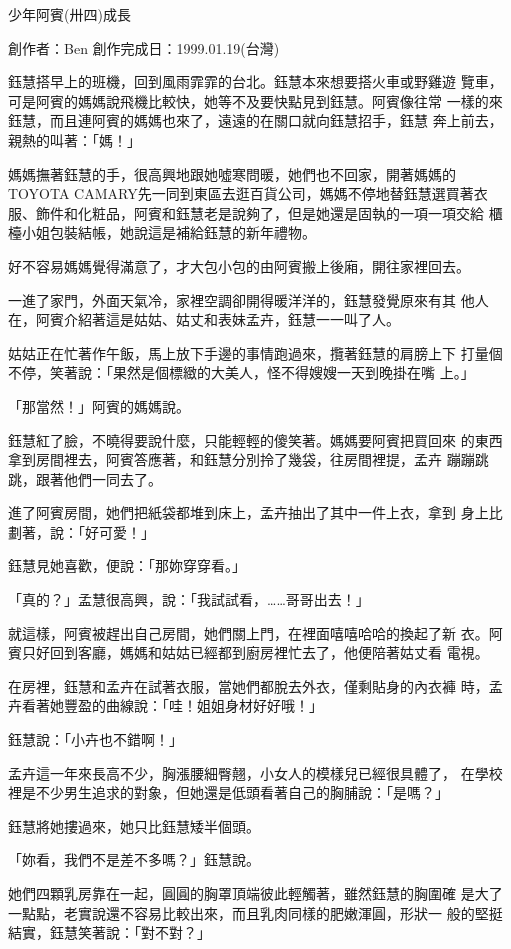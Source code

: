 



少年阿賓(卅四)成長

創作者：Ben
創作完成日：1999.01.19(台灣)


鈺慧搭早上的班機，回到風雨霏霏的台北。鈺慧本來想要搭火車或野雞遊
覽車，可是阿賓的媽媽說飛機比較快，她等不及要快點見到鈺慧。阿賓像往常
一樣的來鈺慧，而且連阿賓的媽媽也來了，遠遠的在關口就向鈺慧招手，鈺慧
奔上前去，親熱的叫著：「媽！」

媽媽撫著鈺慧的手，很高興地跟她噓寒問暖，她們也不回家，開著媽媽的
TOYOTA CAMARY先一同到東區去逛百貨公司，媽媽不停地替鈺慧選買著衣
服、飾件和化粧品，阿賓和鈺慧老是說夠了，但是她還是固執的一項一項交給
櫃檯小姐包裝結帳，她說這是補給鈺慧的新年禮物。

好不容易媽媽覺得滿意了，才大包小包的由阿賓搬上後廂，開往家裡回去。

一進了家門，外面天氣冷，家裡空調卻開得暖洋洋的，鈺慧發覺原來有其
他人在，阿賓介紹著這是姑姑、姑丈和表妹孟卉，鈺慧一一叫了人。

姑姑正在忙著作午飯，馬上放下手邊的事情跑過來，攬著鈺慧的肩膀上下
打量個不停，笑著說：「果然是個標緻的大美人，怪不得嫂嫂一天到晚掛在嘴
上。」

「那當然！」阿賓的媽媽說。

鈺慧紅了臉，不曉得要說什麼，只能輕輕的傻笑著。媽媽要阿賓把買回來
的東西拿到房間裡去，阿賓答應著，和鈺慧分別拎了幾袋，往房間裡提，孟卉
蹦蹦跳跳，跟著他們一同去了。

進了阿賓房間，她們把紙袋都堆到床上，孟卉抽出了其中一件上衣，拿到
身上比劃著，說：「好可愛！」

鈺慧見她喜歡，便說：「那妳穿穿看。」

「真的？」孟慧很高興，說：「我試試看，……哥哥出去！」

就這樣，阿賓被趕出自己房間，她們關上門，在裡面嘻嘻哈哈的換起了新
衣。阿賓只好回到客廳，媽媽和姑姑已經都到廚房裡忙去了，他便陪著姑丈看
電視。

在房裡，鈺慧和孟卉在試著衣服，當她們都脫去外衣，僅剩貼身的內衣褲
時，孟卉看著她豐盈的曲線說：「哇！姐姐身材好好哦！」

鈺慧說：「小卉也不錯啊！」

孟卉這一年來長高不少，胸漲腰細臀翹，小女人的模樣兒已經很具體了，
在學校裡是不少男生追求的對象，但她還是低頭看著自己的胸脯說：「是嗎？」

鈺慧將她摟過來，她只比鈺慧矮半個頭。

「妳看，我們不是差不多嗎？」鈺慧說。

她們四顆乳房靠在一起，圓圓的胸罩頂端彼此輕觸著，雖然鈺慧的胸圍確
是大了一點點，老實說還不容易比較出來，而且乳肉同樣的肥嫩渾圓，形狀一
般的堅挺結實，鈺慧笑著說：「對不對？」

